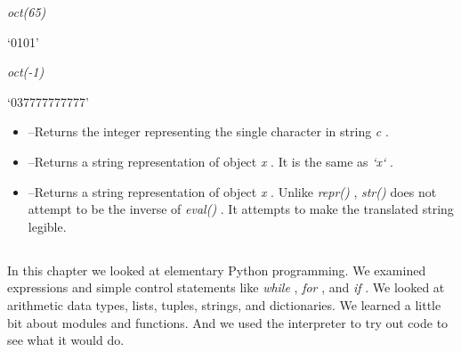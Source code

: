 \emph{oct(65)}

`0101'


\emph{oct(-1)}

`037777777777'

\begin{itemize}

\item
   --Returns the
  integer representing the single character in string \emph{c} .
\item
   --Returns a
  string representation of object \emph{x} . It is the same as
  \emph{`x`} .
\item
   --Returns a string
  representation of object \emph{x} . Unlike \emph{repr()} ,
  \emph{str()} does not attempt to be the inverse of \emph{eval()} . It
  attempts to make the translated string legible.
\end{itemize}

\subsection[Summary]{}

In this chapter we looked at
elementary Python programming. We examined expressions and simple
control statements like \emph{while} , \emph{for} , and \emph{if} . We
looked at arithmetic data types, lists, tuples, strings, and
dictionaries. We learned a little bit about modules and functions. And
we used the interpreter to try out code to see what it would do.

~

